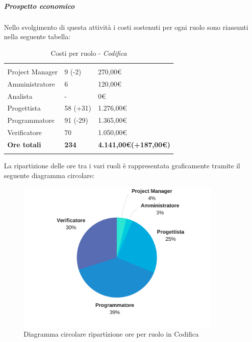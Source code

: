	\subparagraph{Prospetto economico} \Spazio
	Nello svolgimento di questa attività i costi sostenuti per ogni ruolo sono riassunti nella seguente tabella:
	\begin{table}[H]
		\centering
		\begin{tabular}{|p{4cm}|C{4cm}|C{4cm}|}
			
			 & &\\
			Project Manager & 9 (-2) & 270,00\euro \\
			\hline
			Amministratore& 6 & 120,00\euro \\
			\hline
			Analista & - & 0\euro \\
			\hline
			Progettista & 58 (+31) & 1.276,00\euro \\
			\hline
			Programmatore & 91 (-29) & 1.365,00\euro \\
			\hline
			Verificatore & 70 & 1.050,00\euro \\
			\hline
			\textbf{Ore totali} & \textbf{234} & \textbf{4.141,00\euro(+187,00\euro )} \\
		\end{tabular}
		\caption{Costi per ruolo - \textit{Codifica}}
	\end{table}
	
	La ripartizione delle ore tra i vari ruoli è rappresentata graficamente tramite il seguente diagramma circolare:
	
	\begin{figure}[H] 
		\centering 
		\includegraphics[width=0.9\textwidth]{images/CircolareCodificaNuova.png} 
		\caption{Diagramma circolare ripartizione ore per ruolo in Codifica}
		\label{CircolareCodifica}
	\end{figure}


